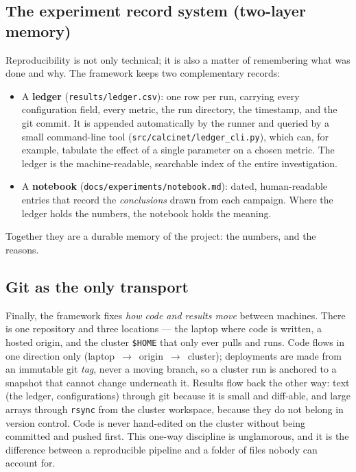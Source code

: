 \documentclass[11pt,a4paper]{article}
\newcommand{\code}[1]{\texttt{#1}}
\begin{document}
\subsection{The experiment record system (two-layer memory)}
Reproducibility is not only technical; it is also a matter of remembering what was done and why.
The framework keeps two complementary records:
\begin{itemize}[leftmargin=1.6em]
  \item A \textbf{ledger} (\code{results/ledger.csv}): one row per run, carrying every
    configuration field, every metric, the run directory, the timestamp, and the git commit.
    It is appended automatically by the runner and queried by a small command-line tool
    (\code{src/calcinet/ledger_cli.py}), which can, for example, tabulate the effect of a single
    parameter on a chosen metric. The ledger is the machine-readable, searchable index of the
    entire investigation.
  \item A \textbf{notebook} (\code{docs/experiments/notebook.md}): dated, human-readable entries
    that record the \emph{conclusions} drawn from each campaign. Where the ledger holds the
    numbers, the notebook holds the meaning.
\end{itemize}
Together they are a durable memory of the project: the numbers, and the reasons.

\subsection{Git as the only transport}
Finally, the framework fixes \emph{how code and results move} between machines. There is one
repository and three locations --- the laptop where code is written, a hosted origin, and the
cluster \code{\$HOME} that only ever pulls and runs. Code flows in one direction only
(laptop~$\rightarrow$~origin~$\rightarrow$~cluster); deployments are made from an immutable git
\emph{tag}, never a moving branch, so a cluster run is anchored to a snapshot that cannot change
underneath it. Results flow back the other way: text (the ledger, configurations) through git
because it is small and diff-able, and large arrays through \code{rsync} from the cluster
workspace, because they do not belong in version control. Code is never hand-edited on the
cluster without being committed and pushed first. This one-way discipline is unglamorous, and it
is the difference between a reproducible pipeline and a folder of files nobody can account for.

\end{document}
